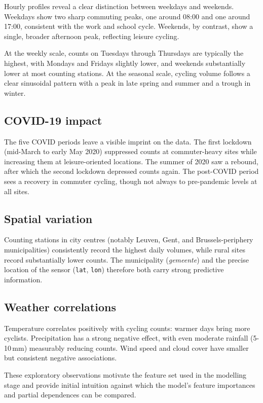 \documentclass[11pt,a4paper]{article}
\begin{document}
Hourly profiles reveal a clear distinction between weekdays and
weekends. Weekdays show two sharp commuting peaks, one around 08:00
and one around 17:00, consistent with the work and school cycle.
Weekends, by contrast, show a single, broader afternoon peak,
reflecting leisure cycling.

At the weekly scale, counts on Tuesdays through Thursdays are typically
the highest, with Mondays and Fridays slightly lower, and weekends
substantially lower at most counting stations. At the seasonal scale,
cycling volume follows a clear sinusoidal pattern with a peak in late
spring and summer and a trough in winter.

\subsection{COVID-19 impact}

The five COVID periods leave a visible imprint on the data. The first
lockdown (mid-March to early May 2020) suppressed counts at
commuter-heavy sites while increasing them at leisure-oriented
locations. The summer of 2020 saw a rebound, after which the second
lockdown depressed counts again. The post-COVID period sees a recovery
in commuter cycling, though not always to pre-pandemic levels at all
sites.

\subsection{Spatial variation}

Counting stations in city centres (notably Leuven, Gent, and
Brussels-periphery municipalities) consistently record the highest
daily volumes, while rural sites record substantially lower counts. The
municipality (\textit{gemeente}) and the precise location of the sensor
(\texttt{lat}, \texttt{lon}) therefore both carry strong predictive
information.

\subsection{Weather correlations}

Temperature correlates positively with cycling counts: warmer days
bring more cyclists. Precipitation has a strong negative effect, with
even moderate rainfall (5-10\,mm) measurably reducing counts. Wind
speed and cloud cover have smaller but consistent negative
associations.

These exploratory observations motivate the feature set used in the
modelling stage and provide initial intuition against which the
model's feature importances and partial dependences can be compared.
\end{document}
